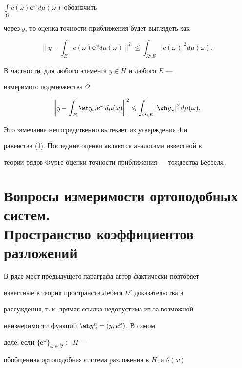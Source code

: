 $\int\limits_\Omega c(\omega)\boldsymbol e^\omega\,d\mu(\omega)$ обозначить


через $y$, то оценка точности приближения будет выглядеть как


$$


\bigg\|y-\int_E c(\omega)\boldsymbol e^\omega d\mu(\omega)\bigg\|^2\leqslant


\int_{\Omega\setminus E}|c(\omega)|^2d\mu(\omega).


$$


В частности, для любого элемента $y\in H$ и любого $E$ ---


измеримого подмножества $\Omega$


$$


\bigg\| y-\int_E\wh y_\omega\boldsymbol e^\omega\,d\mu(\omega


)\bigg\|^2\leqslant\int_{\Omega\setminus E}|\wh y_\omega|^2\,


d\mu(\omega).


$$





Это замечание непосредственно вытекает из утверждения 4 и


равенства (1). Последние оценки являются аналогами известной в


теории рядов Фурье оценки точности приближения --- тождества Бесселя.





\section{Вопросы измеримости ортоподобных систем.\protect\\


Пространство коэффициентов разложений}





В ряде мест предыдущего параграфа автор фактически повторяет


известные в теории пространств Лебега $L^p$ доказательства и


рассуждения, т.\,к. прямая ссылка недопустима из-за возможной


неизмеримости функций $\wh y_\omega^n=(y,e^\omega_n)$. В самом


деле, если $\{\boldsymbol e^\omega\}_{\omega\in\Omega}\subset H$ ---


обобщенная ортоподобная система разложения в $H$, а $\theta(\omega)$


